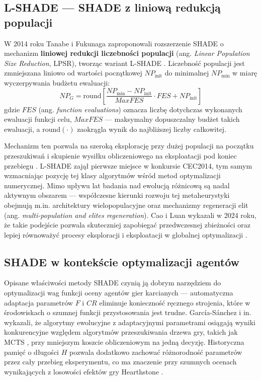 \subsection{L-SHADE --- SHADE z liniową redukcją populacji}
W 2014 roku Tanabe i Fukunaga zaproponowali rozszerzenie SHADE o mechanizm \textbf{liniowej redukcji liczebności populacji} (ang. \textit{Linear Population Size Reduction}, LPSR), tworząc wariant L-SHADE \cite{Tanabe2014LSHADE}. Liczebność populacji jest zmniejszana liniowo od wartości początkowej $NP_{\mathrm{init}}$ do minimalnej $NP_{\mathrm{min}}$ w miarę wyczerpywania budżetu ewaluacji:
\[
NP_G = \mathrm{round}\!\left[ \frac{NP_{\mathrm{min}} - NP_{\mathrm{init}}}{MaxFES} \cdot FES + NP_{\mathrm{init}} \right]
\]
gdzie $FES$ (ang. \textit{function evaluations}) oznacza liczbę dotychczas wykonanych ewaluacji funkcji celu, $MaxFES$ --- maksymalny dopuszczalny budżet takich ewaluacji, a $\mathrm{round}(\cdot)$ zaokrągla wynik do najbliższej liczby całkowitej.

Mechanizm ten pozwala na szeroką eksplorację przy dużej populacji na początku przeszukiwań i skupienie wysiłku obliczeniowego na eksploatacji pod koniec przebiegu \cite{Tanabe2014LSHADE}. L-SHADE zajął pierwsze miejsce w konkursie CEC2014, tym samym wzmacniając pozycję tej klasy algorytmów wśród metod optymalizacji numerycznej. Mimo upływu lat badania nad ewolucją różnicową są nadal aktywnym obszarem --- współczesne kierunki rozwoju tej metaheurystyki obejmują m.in. architektury wielopopulacyjne oraz mechanizmy regeneracji elit (ang. \textit{multi-population and elites regeneration}). Cao i Luan wykazali w 2024 roku, że takie podejście pozwala skuteczniej zapobiegać przedwczesnej zbieżności oraz lepiej równoważyć procesy eksploracji i eksploatacji w globalnej optymalizacji \cite{Cao2024}.

\subsection{SHADE w kontekście optymalizacji agentów}
Opisane właściwości metody SHADE czynią ją dobrym narzędziem do optymalizacji wag funkcji oceny agentów gier karcianych --- automatyczna adaptacja parametrów $F$ i $CR$ eliminuje konieczność ręcznego strojenia, które w środowiskach o szumnej funkcji przystosowania jest trudne. García-Sánchez i in. \cite{sanchez2020} wykazali, że algorytmy ewolucyjne z adaptacyjnymi parametrami osiągają wyniki konkurencyjne względem algorytmów przeszukiwania drzewa gry, takich jak MCTS \cite{Swiechowski2022, Browne2012}, przy mniejszym koszcie obliczeniowym na jedną decyzję. Historyczna pamięć o długości $H$ pozwala dodatkowo zachować różnorodność parametrów przez cały przebieg eksperymentu, co ma znaczenie przy szumnych ocenach wynikających z losowości efektów gry Hearthstone \cite{hoover2020}.

